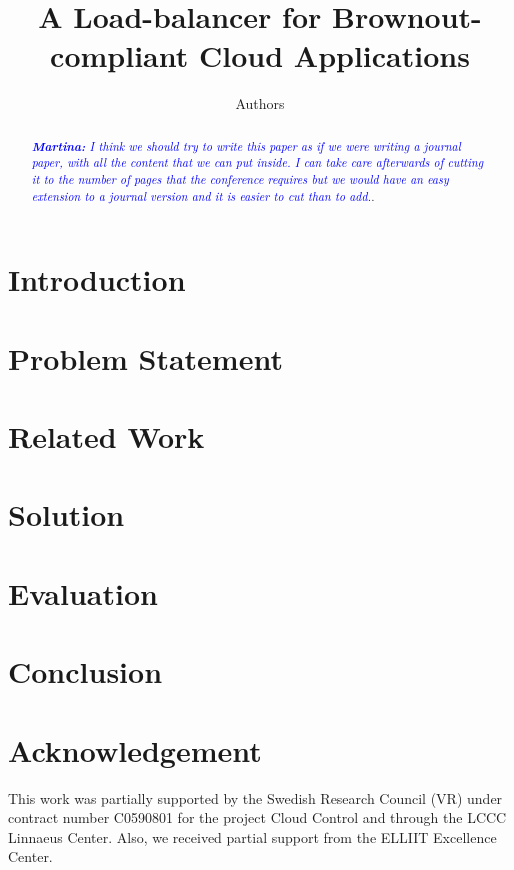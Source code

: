 \documentclass[letterpaper, 10 pt, conference]{ieeeconf}
\title{\LARGE \bf A Load-balancer for Brownout-compliant Cloud Applications}
\author{Authors}
\begin{document}
\maketitle
\thispagestyle{empty}
\pagestyle{empty}

\begin{abstract}
  \textcolor{blue}{\textit{\textbf{Martina:} I think we should try to
      write this paper as if we were writing a journal paper, with all
      the content that we can put inside. I can take care afterwards
      of cutting it to the number of pages that the conference
      requires but we would have an easy extension to a journal
      version and it is easier to cut than to add.}}.
\end{abstract}

\section{Introduction}
\label{sec:introduction}


\section{Problem Statement}
\label{sec:problem}


\section{Related Work}
\label{sec:related}


\section{Solution}
\label{sec:solution}


\section{Evaluation}
\label{sec:evaluation}


\section{Conclusion}
\label{sec:conclusion}

\section*{Acknowledgement}
  This work was partially supported by the Swedish Research Council
  (VR) under contract number C0590801 for the project Cloud Control
  and through the LCCC Linnaeus Center. Also, we received partial
  support from the ELLIIT Excellence Center.

\printbibliography
\end{document}
